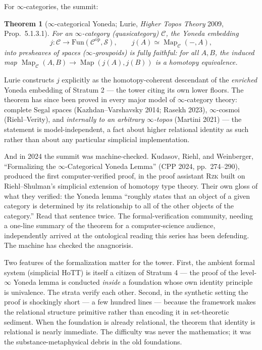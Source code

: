 \documentclass[11pt]{article}
\theoremstyle{plain}
\newtheorem{theorem}{Theorem}[section]
\theoremstyle{definition}
\theoremstyle{remark}
\newcommand{\C}{\mathcal{C}}
\newcommand{\op}{\mathrm{op}}
\newcommand{\Map}{\operatorname{Map}}
\begin{document}
For $\infty$-categories, the summit:

\begin{theorem}[$\infty$-categorical Yoneda; Lurie, \emph{Higher Topos Theory} 2009, Prop.\ 5.1.3.1]\label{thm:infty-yoneda}
For an $\infty$-category (quasicategory) $\C$, the Yoneda embedding
\[
j\colon \C \longrightarrow \mathrm{Fun}(\C^{\op}, \mathcal{S}), \qquad j(A) \simeq \Map_\C(-, A),
\]
into presheaves of \emph{spaces} ($\infty$-groupoids) is fully faithful: for all $A, B$, the induced map $\Map_\C(A,B) \to \Map(j(A), j(B))$ is a homotopy equivalence.
\end{theorem}

Lurie constructs $j$ explicitly as the homotopy-coherent descendant of the \emph{enriched} Yoneda embedding of Stratum 2 --- the tower citing its own lower floors. The theorem has since been proved in every major model of $\infty$-category theory: complete Segal spaces (Kazhdan--Varshavsky 2014; Rasekh 2023), $\infty$-cosmoi (Riehl--Verity), and \emph{internally to an arbitrary $\infty$-topos} (Martini 2021) --- the statement is model-independent, a fact about higher relational identity as such rather than about any particular simplicial implementation.

And in 2024 the summit was machine-checked. Kudasov, Riehl, and Weinberger, ``Formalizing the $\infty$-Categorical Yoneda Lemma'' (CPP 2024, pp.\ 274--290), produced the first computer-verified proof, in the proof assistant \textsc{Rzk} built on Riehl--Shulman's simplicial extension of homotopy type theory. Their own gloss of what they verified: the Yoneda lemma ``roughly states that an object of a given category is determined by its relationship to all of the other objects of the category.'' Read that sentence twice. The formal-verification community, needing a one-line summary of the theorem for a computer-science audience, independently arrived at the ontological reading this series has been defending. The machine has checked the anagnorisis.

Two features of the formalization matter for the tower. First, the ambient formal system (simplicial HoTT) is itself a citizen of Stratum 4 --- the proof of the level-$\infty$ Yoneda lemma is conducted \emph{inside} a foundation whose own identity principle is univalence. The strata verify each other. Second, in the synthetic setting the proof is shockingly short --- a few hundred lines --- because the framework makes the relational structure primitive rather than encoding it in set-theoretic sediment. When the foundation is already relational, the theorem that identity is relational is nearly immediate. The difficulty was never the mathematics; it was the substance-metaphysical debris in the old foundations.
\end{document}

